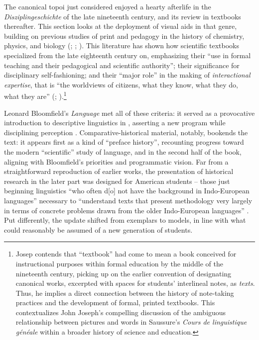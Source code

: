 \documentclass[output=paper]{langscibook}
\begin{document}
The canonical topoi just considered enjoyed a hearty afterlife in the \emph{Disziplin\-geschichte} of the late nineteenth century, and its review in textbooks thereafter. This section looks at the deployment of visual aids in that genre, building on previous studies of print and pedagogy in the history of chemistry, physics, and biology (\citealt{bertomeusanchez2002}; \citealt{Kuhn1962}; \citealt{Hopwood2015}). This literature has shown how scientific textbooks specialized from the late eighteenth century on, emphasizing their ``use in formal teaching and their pedagogical and scientific authority''; their significance for disciplinary self-fashioning; and their ``major role'' in the making of \emph{interactional expertise}, that is ``the worldviews of citizens, what they know, what they do, what they are'' (\citealt[475, 479]{Simon2016}; \citealt[406-408]{Johns1998}).\footnote{Josep \citet{Simon2016} contends that ``textbook'' had come to mean a book conceived for instructional purposes within formal education by the middle of the nineteenth century, picking up on the earlier convention of designating canonical works, excerpted with spaces for students' interlineal notes, as \emph{texts}. Thus, he implies a direct connection between the history of note-taking practices and the development of formal, printed textbooks. This contextualizes John Joseph's compelling \citeyear{Joseph2017} discussion of the ambiguous relationship between pictures and words in Saussure's \emph{Cours de linguistique généale} within a broader history of science and education.}

Leonard Bloomfield's \emph{Language} met all of these criteria: it served as a provocative introduction to descriptive linguistics in \citeyear{Bloomfield1933}, asserting a new program while disciplining perception \citep[v-vi]{BloomfieldHoijer1965}. Comparative-historical material, notably, bookends the text: it appears first as a kind of ``preface history'', recounting progress toward the modern ``scientific'' study of language, and in the second half of the book, aligning with Bloomfield's priorities and programmatic vision. Far from a straightforward reproduction of earlier works, the presentation of historical research in the later part was designed for American students – those just beginning linguistics ``who often d[o] not have the background in Indo-European languages'' necessary to ``understand texts that present methodology very largely in terms of concrete problems drawn from the older Indo-European languages'' \citep[vi]{BloomfieldHoijer1965}. Put differently, the update shifted from exemplars to models, in line with what could reasonably be assumed of a new generation of students.
\end{document}

